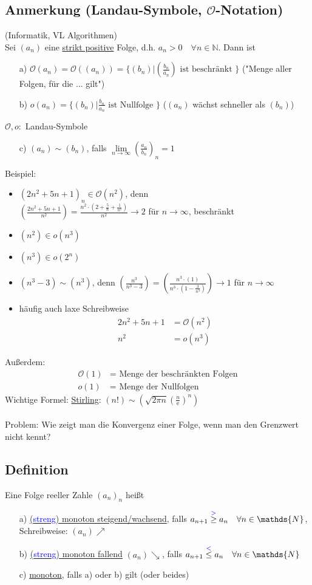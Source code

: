 \documentclass[12pt, titlepage]{article}
\newcommand{\N}{\mathds{N}}
\newcommand{\e}{\textrm{e}}
\newcommand{\infn}{n\rightarrow\infty}
\newcommand{\bmark}[1]{\textcolor{blue}{#1}}
\renewcommand{\>}{\rightarrow}
\renewcommand{\*}{\cdot}
\begin{document}
	\subsection{Anmerkung (Landau-Symbole, $\mathcal{O}$-Notation)}
	(Informatik, VL Algorithmen)\\
	Sei $(a_n)$ eine \underline{strikt positive} Folge, d.h. $a_n>0\quad\forall n\in\N$. Dann ist
	\begin{itemize}
		\item[a)] $\mathcal{O}(a_n)=\mathcal{O}((a_n))=\{(b_n)|(\frac{b_n}{a_n})\textrm{ ist beschränkt }\}$ ("Menge aller Folgen, für die ... gilt")
		\item[b)] $o(a_n)=\{(b_n)|\frac{b_n}{a_n}\textrm{ ist Nullfolge }\}$ ($(a_n)$ wächst schneller als $(b_n)$)
	\end{itemize}
	$\mathcal{O},o\colon $ Landau-Symbole
	\begin{itemize}
		\item[c)] $(a_n)\sim(b_n)$, falls $\lim\limits_{\infn}(\frac{a_n}{b_n})_n=1$
	\end{itemize}
	Beispiel:
	\begin{itemize}
		\item $(2n^2+5n+1)_n\in\mathcal{O}(n^2)$, denn\\
		$(\frac{2n^2+5n+1}{n^2})=\frac{n^2\*(2+\frac{5}{n}+\frac{1}{n^2})}{n^2}\>2$ für $\infn$, beschränkt
		\item $(n^2)\in o(n^3)$
		\item $(n^3)\in o(2^n)$
		\item $(n^3-3)\sim(n^3)$, denn $(\frac{n^3}{n^3-3})=(\frac{n^3\*(1)}{n^3\*(1-\frac{3}{n^3})})\>1$ für $\infn$
		\item häufig auch laxe Schreibweise
		\begin{align*}
			2n^2+5n+1&=\mathcal{O}(n^2)\\
			n^2&=o(n^3)
		\end{align*}
	\end{itemize}
	Außerdem:
	\begin{align*}
		\mathcal{O}(1)&=\textrm{ Menge der beschränkten Folgen}\\
		o(1)&=\textrm{ Menge der Nullfolgen}
	\end{align*}
	Wichtige Formel: \underline{Stirling}: $(n!)\sim(\sqrt{2\pi n}(\frac{n}{\e})^n)$\\
	\\
	Problem: Wie zeigt man die Konvergenz einer Folge, wenn man den Grenzwert nicht kennt?
	\subsection{Definition}
	Eine Folge reeller Zahle $(a_n)_n$ heißt
	\begin{itemize}
		\item[a)] \underline{(\bmark{streng}) monoton steigend/wachsend}, falls $a_{n+1}\overset{\bmark{>}}{\geq}a_n\quad\forall n\in\N$, Schreibweise: $(a_n)\nearrow$
		\item[b)] \underline{(\bmark{streng}) monoton fallend} $(a_n)\searrow$, falls $a_{n+1}\overset{\bmark{<}}{\leq}a_n\quad\forall n\in\N$
		\item[c)] \underline{monoton}, falls a) oder b) gilt (oder beides)
	\end{itemize}	
\end{document}
